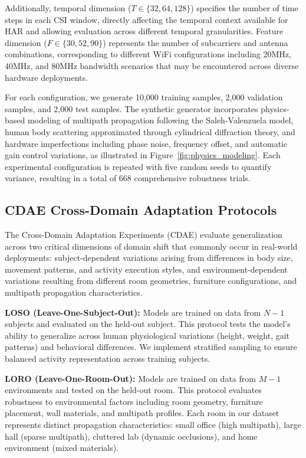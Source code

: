 \documentclass[journal]{IEEEtran}
\begin{document}
Additionally, temporal dimension ($T \in \{32, 64, 128\}$) specifies the number of time steps in each CSI window, directly affecting the temporal context available for HAR and allowing evaluation across different temporal granularities. Feature dimension ($F \in \{30, 52, 90\}$) represents the number of subcarriers and antenna combinations, corresponding to different WiFi configurations including 20MHz, 40MHz, and 80MHz bandwidth scenarios that may be encountered across diverse hardware deployments.

For each configuration, we generate 10,000 training samples, 2,000 validation samples, and 2,000 test samples. The synthetic generator incorporates physics-based modeling of multipath propagation following the Saleh-Valenzuela model, human body scattering approximated through cylindrical diffraction theory, and hardware imperfections including phase noise, frequency offset, and automatic gain control variations, as illustrated in Figure~\ref{fig:physics_modeling}. Each experimental configuration is repeated with five random seeds to quantify variance, resulting in a total of 668 comprehensive robustness trials.

\subsection{CDAE Cross-Domain Adaptation Protocols}

The Cross-Domain Adaptation Experiments (CDAE) evaluate generalization across two critical dimensions of domain shift that commonly occur in real-world deployments: subject-dependent variations arising from differences in body size, movement patterns, and activity execution styles, and environment-dependent variations resulting from different room geometries, furniture configurations, and multipath propagation characteristics.

\textbf{LOSO (Leave-One-Subject-Out):} Models are trained on data from $N-1$ subjects and evaluated on the held-out subject. This protocol tests the model's ability to generalize across human physiological variations (height, weight, gait patterns) and behavioral differences. We implement stratified sampling to ensure balanced activity representation across training subjects.

\textbf{LORO (Leave-One-Room-Out):} Models are trained on data from $M-1$ environments and tested on the held-out room. This protocol evaluates robustness to environmental factors including room geometry, furniture placement, wall materials, and multipath profiles. Each room in our dataset represents distinct propagation characteristics: small office (high multipath), large hall (sparse multipath), cluttered lab (dynamic occlusions), and home environment (mixed materials).
\end{document}
